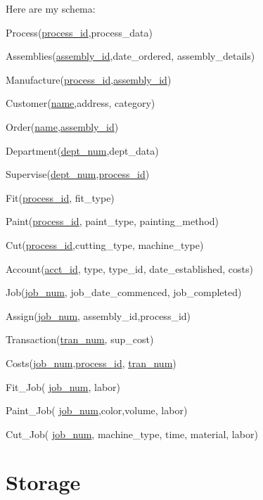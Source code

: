 \documentclass[11pt]{article}
\begin{document}
\indent Here are my schema:

Process(\underline{process\_id},process\_data)

Assemblies(\underline{assembly\_id},date\_ordered, assembly\_details)

Manufacture(\underline{process\_id},\underline{assembly\_id})

Customer(\underline{name},address, category)

Order(\underline{name},\underline{assembly\_id})

Department(\underline{dept\_num},dept\_data)

Supervise(\underline{dept\_num},\underline{process\_id})

Fit(\underline{process\_id}, fit\_type)

Paint(\underline{process\_id}, paint\_type, painting\_method)

Cut(\underline{process\_id},cutting\_type, machine\_type)


Account(\underline{acct\_id}, type, type\_id, date\_established, costs)

Job(\underline{job\_num}, job\_date\_commenced, job\_completed)

Assign(\underline{job\_num}, assembly\_id,process\_id)

Transaction(\underline{tran\_num}, sup\_cost)

Costs(\underline{job\_num},\underline{process\_id},  \underline{tran\_num})

Fit\_Job( \underline{job\_num}, labor)

Paint\_Job( \underline{job\_num},color,volume, labor)

Cut\_Job( \underline{job\_num}, machine\_type, time, material, labor)

\newpage
\section{Storage}
\end{document}
